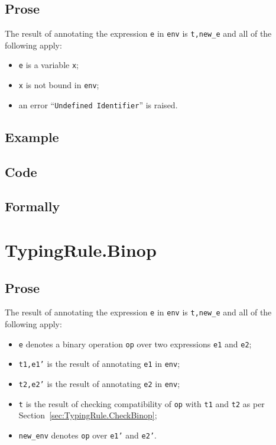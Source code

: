 \documentclass{book}
\begin{document}
  \subsection{Prose}
  The result of annotating the expression \texttt{e} in \texttt{env} is
\texttt{t,new\_e} and all of the following apply:
  \begin{itemize}
  \item \texttt{e} is a variable \texttt{x};
  \item \texttt{x} is not bound in \texttt{env};
  \item an error ``\texttt{Undefined Identifier}'' is raised.
  \end{itemize}

  \subsection{Example}

  \subsection{Code}

\begin{emptyformal}
  \subsection{Formally}
\end{emptyformal}


\section{TypingRule.Binop \label{sec:TypingRule.Binop}}

  \subsection{Prose}
  The result of annotating the expression \texttt{e} in \texttt{env} is
\texttt{t,new\_e} and all of the following apply:
  \begin{itemize}
  \item \texttt{e} denotes a binary operation \texttt{op} over two expressions \texttt{e1} and \texttt{e2};
  \item \texttt{t1,e1'} is the result of annotating \texttt{e1} in \texttt{env};
  \item \texttt{t2,e2'} is the result of annotating \texttt{e2} in \texttt{env};
  \item \texttt{t} is the result of checking compatibility of \texttt{op} with \texttt{t1} and \texttt{t2} as per Section~\ref{sec:TypingRule.CheckBinop};
  \item \texttt{new\_env} denotes \texttt{op} over \texttt{e1'} and \texttt{e2'}.
  \end{itemize}
\end{document}
